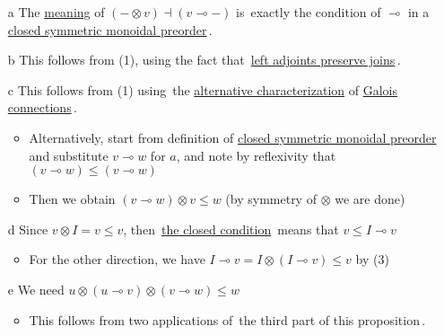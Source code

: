 \begin{itemize}
    \item[a] The \href{doc/1 math/Seven Sketches in Compositionality/Chapter 1: Generative Effects/6 Galois connections/1 Definition and examples/Galois connection}{meaning} of $(- \otimes v) \dashv (v \multimap -)$ is \,exactly the condition of $\multimap$ in a \href{doc/1 math/Seven Sketches in Compositionality/Chapter 2: Resource theories/5 Computing presented V-categories with matrix mult/1 Monoidal closed preorders/1 Closed SMP}{closed symmetric monoidal preorder}\,.
    \item[b] This follows from (1), using the fact that \,\href{doc/1 math/Seven Sketches in Compositionality/Chapter 1: Generative Effects/6 Galois connections/3 Basic theory of Galois connections/2 Adjoints preserving meets and joins}{left adjoints preserve joins}\,.
    \item[c] This follows from (1) using \,the \href{doc/1 math/Seven Sketches in Compositionality/Chapter 1: Generative Effects/6 Galois connections/3 Basic theory of Galois connections/1 Galois connection alternate form}{alternative characterization} of \href{doc/1 math/Seven Sketches in Compositionality/Chapter 1: Generative Effects/6 Galois connections/1 Definition and examples/Galois connection}{Galois connections}\,.
          \begin{itemize}
            \item Alternatively, start from definition of \href{doc/1 math/Seven Sketches in Compositionality/Chapter 2: Resource theories/5 Computing presented V-categories with matrix mult/1 Monoidal closed preorders/1 Closed SMP}{closed symmetric monoidal preorder} and substitute $v \multimap w$ for $a$, and note by reflexivity that  $(v \multimap w) \leq (v \multimap w)$
            \item Then we obtain $(v \multimap w) \otimes v \leq w$ (by symmetry of $\otimes$ we are done)
          \end{itemize}
    \item[d] Since $v \otimes I = v \leq v$, then \,\href{doc/1 math/Seven Sketches in Compositionality/Chapter 2: Resource theories/5 Computing presented V-categories with matrix mult/1 Monoidal closed preorders/1 Closed SMP}{the closed condition}\, means that $v \leq I \multimap v$
          \begin{itemize}
            \item For the other direction, we have $I \multimap v = I \otimes (I \multimap v) \leq v$ by (3)
          \end{itemize}
    \item[e] We need $u \otimes (u \multimap v) \otimes (v \multimap w) \leq w$
          \begin{itemize}
            \item This follows from two applications of \,the third part of this proposition\,.
          \end{itemize}
  \end{itemize}